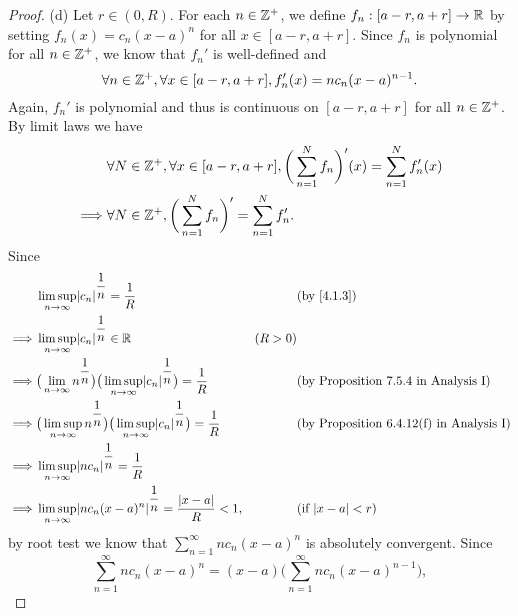 \begin{proof}{(d)}
  Let \(r \in (0, R)\).
  For each \(n \in \mathbb{Z}^+\), we define \(f_n : [a - r, a + r] \to \mathbb{R}\) by setting \(f_n(x) = c_n (x - a)^n\) for all \(x \in [a - r, a + r]\).
  Since \(f_n\) is polynomial for all \(n \in \mathbb{Z}^+\), we know that \(f_n'\) is well-defined and
  \[
    \forall n \in \mathbb{Z}^+, \forall x \in [a - r, a + r], f_n'(x) = n c_n (x - a)^{n - 1}.
  \]
  Again, \(f_n'\) is polynomial and thus is continuous on \([a - r, a + r]\) for all \(n \in \mathbb{Z}^+\).
  By limit laws we have
  \begin{align*}
             & \forall N \in \mathbb{Z}^+, \forall x \in [a - r, a + r], \bigg(\sum_{n = 1}^N f_n\bigg)'(x) = \sum_{n = 1}^N f_n'(x) \\
    \implies & \forall N \in \mathbb{Z}^+, \bigg(\sum_{n = 1}^N f_n\bigg)' = \sum_{n = 1}^N f_n'.
  \end{align*}
  Since
  \begin{align*}
             & \limsup_{n \to \infty} \abs{c_n}^{\dfrac{1}{n}} = \dfrac{1}{R}                                                             &         & \by{4.1.3}                                      \\
    \implies & \limsup_{n \to \infty} \abs{c_n}^{\dfrac{1}{n}} \in \R                                                                     & (R > 0)                                                   \\
    \implies & \big(\lim_{n \to \infty} n^{\dfrac{1}{n}}\big) \big(\limsup_{n \to \infty} \abs{c_n}^{\dfrac{1}{n}}\big) = \dfrac{1}{R}    &         & \text{(by Proposition 7.5.4 in Analysis I)}     \\
    \implies & \big(\limsup_{n \to \infty} n^{\dfrac{1}{n}}\big) \big(\limsup_{n \to \infty} \abs{c_n}^{\dfrac{1}{n}}\big) = \dfrac{1}{R} &         & \text{(by Proposition 6.4.12(f) in Analysis I)} \\
    \implies & \limsup_{n \to \infty} \abs{n c_n}^{\dfrac{1}{n}} = \dfrac{1}{R}                                                                                                                       \\
    \implies & \limsup_{n \to \infty} \abs{n c_n (x - a)^n}^{\dfrac{1}{n}} = \dfrac{\abs{x - a}}{R} < 1,                                  &         & \text{(if \(\abs{x - a} < r\))}
  \end{align*}
  by root test we know that \(\sum_{n = 1}^\infty n c_n (x - a)^n\) is absolutely convergent.
  Since
  \[
    \sum_{n = 1}^\infty n c_n (x - a)^n = (x - a) \bigg(\sum_{n = 1}^\infty n c_n (x - a)^{n - 1}\bigg),
\]
\end{proof}

